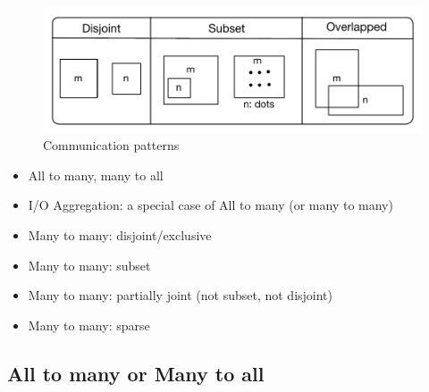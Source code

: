 \begin{figure}[!htb]
\vspace{-0.1in}
\centering
\includegraphics[scale=0.55]{figures/patterns.pdf}
\vspace{-0.1in}
\caption{Communication patterns}
\vspace{-0.1in}
\label{fig:patterns}
\end{figure}

\begin{itemize}
\item All to many, many to all
\item I/O Aggregation: a special case of All to many (or many to many)
\item Many to many: disjoint/exclusive
\item Many to many: subset
\item Many to many: partially joint (not subset, not disjoint)
\item Many to many: sparse
\end{itemize}

\subsection{All to many or Many to all}

